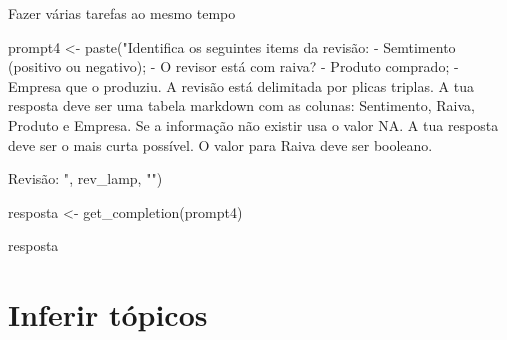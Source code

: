 \documentclass[
  letterpaper,
  paper=6in:9in,
  pagesize=pdftex,
  headinclude=on,
  footinclude=on,
  12pt]{scrbook}
\newenvironment{Shaded}{\begin{snugshade}}{\end{snugshade}}
\newcommand{\FunctionTok}[1]{\textcolor[rgb]{0.28,0.35,0.67}{#1}}
\newcommand{\NormalTok}[1]{\textcolor[rgb]{0.00,0.23,0.31}{#1}}
\newcommand{\OtherTok}[1]{\textcolor[rgb]{0.00,0.23,0.31}{#1}}
\newcommand{\StringTok}[1]{\textcolor[rgb]{0.13,0.47,0.30}{#1}}
\begin{document}
Fazer várias tarefas ao mesmo tempo

\begin{Shaded}
\begin{Highlighting}[]
\NormalTok{prompt4 }\OtherTok{\textless{}{-}} \FunctionTok{paste}\NormalTok{(}\StringTok{"Identifica os seguintes items da revisão:}
\StringTok{{-} Semtimento (positivo ou negativo);}
\StringTok{{-} O revisor está com raiva?}
\StringTok{{-} Produto comprado;}
\StringTok{{-} Empresa que o produziu. }
\StringTok{A  revisão está delimitada por plicas triplas. }
\StringTok{A tua resposta deve ser uma tabela markdown com as colunas: Sentimento, Raiva, Produto e Empresa.}
\StringTok{Se a informação não existir usa o valor \textquotesingle{}NA\textquotesingle{}. A tua resposta deve ser o mais curta possível.}
\StringTok{O valor para Raiva deve ser booleano.}

\StringTok{                 Revisão: \textquotesingle{}\textquotesingle{}\textquotesingle{} "}\NormalTok{, rev\_lamp, }\StringTok{"\textquotesingle{}\textquotesingle{}\textquotesingle{}"}\NormalTok{)}

\NormalTok{resposta }\OtherTok{\textless{}{-}} \FunctionTok{get\_completion}\NormalTok{(prompt4)}

\NormalTok{resposta}
\end{Highlighting}
\end{Shaded}

\hypertarget{inferir-tuxf3picos}{%
\section{Inferir tópicos}\label{inferir-tuxf3picos}}
\end{document}
